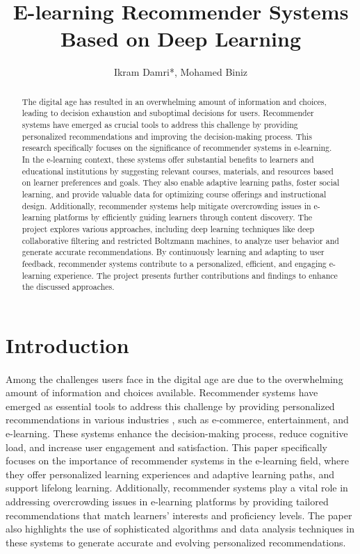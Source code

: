 \documentclass{cup-pan}
\title{E-learning Recommender Systems Based on
Deep Learning }
\author[ ]{Ikram Damri*, Mohamed Biniz}
\affil[      ]{Laboratory of Innovation in Mathematics, Applications and Information Technology,}
\affil[ ]{Polydisciplinary Faculty, Sultan Moulay Slimane University, Beni Mellal, Morocco.}
\affil[  ]{}
\affil[ ]{*Corresponding author E-mail: \url{ikram.damri@usms.ac.ma}}
\begin{document}
\maketitle

\begin{abstract}
The digital age has resulted in an overwhelming amount of information and choices, leading to decision exhaustion and suboptimal decisions for users. Recommender systems have emerged as crucial tools to address this challenge by providing personalized recommendations and improving the decision-making process. This research specifically focuses on the significance of recommender systems in e-learning. In the e-learning context, these systems offer substantial benefits to learners and educational institutions by suggesting relevant courses, materials, and resources based on learner preferences and goals. They also enable adaptive learning paths, foster social learning, and provide valuable data for optimizing course offerings and instructional design. Additionally, recommender systems help mitigate overcrowding issues in e-learning platforms by efficiently guiding learners through content discovery. The project explores various approaches, including deep learning techniques like deep collaborative filtering and restricted Boltzmann machines, to analyze user behavior and generate accurate recommendations. By continuously learning and adapting to user feedback, recommender systems contribute to a personalized, efficient, and engaging e-learning experience. The project presents further contributions and findings to enhance the discussed approaches.

\end{abstract}

\section{Introduction}
\label{sec:overview}
\paragraph{}
Among the challenges users face in the digital age are due to the overwhelming amount of information and choices available. Recommender systems have emerged as essential tools to address this challenge by providing personalized recommendations in various industries \cite{1, 2}, such as e-commerce, entertainment, and e-learning. These systems enhance the decision-making process, reduce cognitive load, and increase user engagement and satisfaction. This paper specifically focuses on the importance of recommender systems in the e-learning field, where they offer personalized learning experiences and adaptive learning paths, and support lifelong learning. Additionally, recommender systems play a vital role in addressing overcrowding issues in e-learning platforms by providing tailored recommendations that match learners' interests and proficiency levels. The paper also highlights the use of sophisticated algorithms and data analysis techniques in these systems to generate accurate and evolving personalized recommendations.
\end{document}
